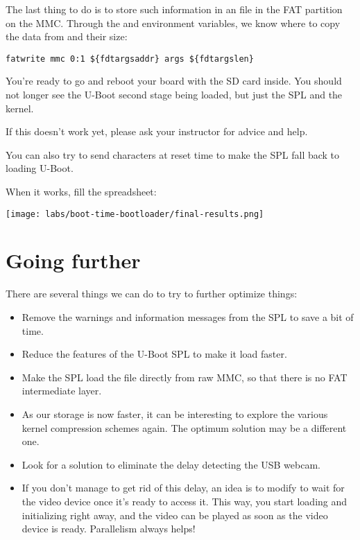 The last thing to do is to store such information in an  file
in the FAT partition on the MMC. Through the  and
 environment variables, we know where to copy the
data from and their size:

\begin{verbatim}
fatwrite mmc 0:1 ${fdtargsaddr} args ${fdtargslen}
\end{verbatim}

You're ready to go and reboot your board with the SD card inside.
You should not longer see the U-Boot second stage being loaded, but just
the SPL and the kernel.

If this doesn't work yet, please ask your instructor for advice and help.

You can also try to send  characters at reset time to make
the SPL fall back to loading U-Boot.

When it works, fill the 
spreadsheet:

\texttt{[image: labs/boot-time-bootloader/final-results.png]}

\section{Going further}

There are several things we can do to try to further optimize things:

\begin{itemize}
\item Remove the warnings and information messages from the SPL
      to save a bit of time.
\item Reduce the features of the U-Boot SPL to make it load faster.
\item Make the SPL load the  file directly from raw MMC,
      so that there is no FAT intermediate layer.
\item As our storage is now faster, it can be interesting to explore the
      various kernel compression schemes again. The optimum solution may be a
      different one.
\item Look for a solution to eliminate the delay detecting the USB
      webcam.
\item If you don't manage to get rid of this delay, an idea is to modify
       to wait for the video device once it's ready to
      access it. This way, you start loading and initializing
       right away, and the video can be played as soon as
      the video device is ready. Parallelism always helps!
\end{itemize}

